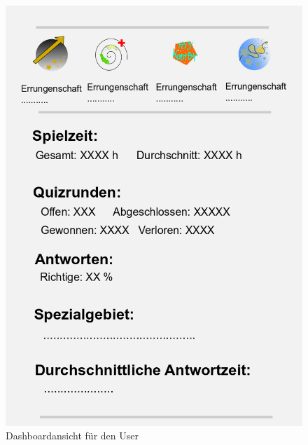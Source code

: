 \documentclass[11pt,a4paper]{scrreprt}
\begin{document}
\begin{figure}
	\centering
	\includegraphics[height = 0.4\textheight]{Dashboard.png}
	\caption{Dashboardansicht für den User}
	\label{img:Dashboard}
\end{figure}
\end{document}
